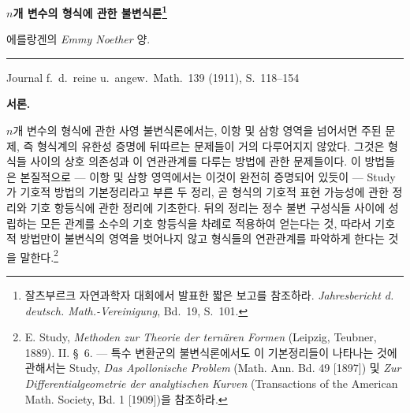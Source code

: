 
\begin{center}
{\Large\bfseries $n$개 변수의 형식에 관한 불변식론\footnote{잘츠부르크 자연과학자 대회에서 발표한 짧은 보고를 참조하라. \emph{Jahresbericht d. deutsch. Math.-Vereinigung}, Bd.\ 19, S.\ 101.}}\par
\vspace{0.5em}
에를랑겐의 \emph{Emmy Noether} 양.\par
\medskip
\rule{0.22\linewidth}{0.4pt}\par
\vspace{0.7em}
Journal f.\ d.\ reine u.\ angew.\ Math.\ 139 (1911), S.\ 118--154
\end{center}

\begin{center}
\textbf{서론.}
\end{center}
$n$개 변수의 형식에 관한 사영 불변식론에서는, 이항 및 삼항 영역을 넘어서면 주된 문제, 즉 형식계의 유한성 증명에 뒤따르는 문제들이 거의 다루어지지 않았다. 그것은 형식들 사이의 상호 의존성과 이 연관관계를 다루는 방법에 관한 문제들이다. 이 방법들은 본질적으로 --- 이항 및 삼항 영역에서는 이것이 완전히 증명되어 있듯이 --- Study가 \glqq{}기호적 방법의 기본정리\grqq{}라고 부른 두 정리, 곧 형식의 기호적 표현 가능성에 관한 정리와 기호 항등식에 관한 정리에 기초한다. 뒤의 정리는 정수 불변 구성식들 사이에 성립하는 모든 관계를 소수의 기호 항등식을 차례로 적용하여 얻는다는 것, 따라서 기호적 방법만이 불변식의 영역을 벗어나지 않고 형식들의 연관관계를 파악하게 한다는 것을 말한다.\footnote{E. Study, \emph{Methoden zur Theorie der ternären Formen} (Leipzig, Teubner, 1889). II. \S\ 6. --- 특수 변환군의 불변식론에서도 이 기본정리들이 나타나는 것에 관해서는 Study, \emph{Das Apollonische Problem} (Math. Ann. Bd. 49 [1897]) 및 \emph{Zur Differentialgeometrie der analytischen Kurven} (Transactions of the American Math. Society, Bd. 1 [1909])을 참조하라.}


